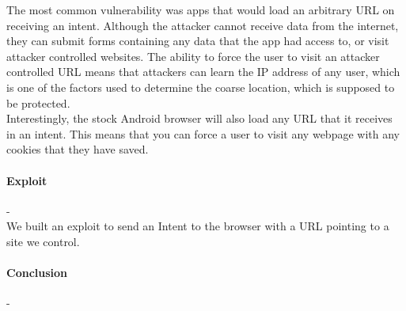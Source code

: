 \documentclass[12pt,a4paper]{article} \usepackage{verbatim}
\begin{document}
The most common vulnerability was apps that would load an arbitrary URL on receiving an intent. Although the attacker cannot receive data from the internet, they can submit forms containing any data that the app had access to, or visit attacker controlled websites. The ability to force the user to visit an attacker controlled URL means that attackers can learn the IP address of any user, which is one of the factors used to determine the coarse location, which is supposed to be protected.  \\
Interestingly, the stock Android browser will also load any URL that it receives in an intent. This means that you can force a user to visit any webpage with any cookies that they have saved. 

\paragraph{Exploit} -\\
We built an exploit to send an Intent to the browser with a URL pointing to a site we control. 

\paragraph{Conclusion} -\\

 
\end{document}
